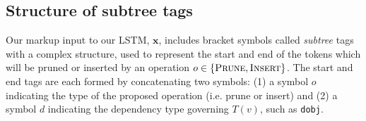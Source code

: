 \documentclass[11pt,a4paper]{article}
\begin{document}
\subsection{Structure of subtree tags}\label{s:subtree}

Our markup input to our LSTM, $\bm{x}$, includes bracket symbols called \textit{subtree} tags with a complex structure, used to represent the start and end of the tokens which will be pruned or inserted by an operation $o \in \{ \textsc{Prune},\textsc{Insert}\}$. The start and end tags are each formed by concatenating two symbols: (1) a symbol $o$ indicating the type of the proposed operation (i.e. prune or insert) and (2) a symbol $d$ indicating the dependency type governing $T(v)$, such as \texttt{dobj}. 



\end{document}
